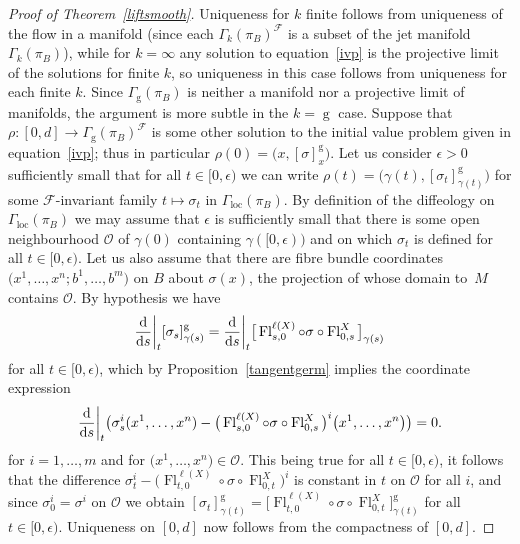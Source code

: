 \documentclass[10pt,a4paper]{amsart}
\numberwithin{equation}{section}
\def\loc{\operatorname{loc}}
\def\g{\operatorname{g}}
\def\Fl{\operatorname{Fl}}
\def\FF{{\mathcal{F}}}
\def\OO{{\mathcal{O}}}
\begin{document}
\begin{proof}[Proof of Theorem~\ref{liftsmooth}]
Uniqueness for $k$ finite follows from uniqueness of the flow in a manifold (since each $\Gamma_{k}(\pi_{B})^{\FF}$ is a subset of the jet manifold $\Gamma_{k}(\pi_{B})$), while for $k=\infty$ any solution to equation~\eqref{ivp} is the projective limit of the solutions for finite $k$, so uniqueness in this case follows from uniqueness for each finite $k$. Since $\Gamma_{\g}(\pi_{B})$ is neither a manifold nor a projective limit of manifolds, the argument is more subtle in the $k=\g$ case. Suppose that $\rho\colon [0,d]\rightarrow\Gamma_{\g}(\pi_{B})^{\FF}$ is some other solution to the initial value problem given in equation~\eqref{ivp}; thus in particular $\rho(0) = \big(x,[\sigma]^{\g}_{x}\big)$. Let us consider $\epsilon>0$ sufficiently small that for all $t\in[0,\epsilon)$ we can write $\rho(t) = \big(\gamma(t),[\sigma_{t}]^{\g}_{\gamma(t)}\big)$ for some $\FF$-invariant family $t\mapsto\sigma_{t}$ in $\Gamma_{\loc}(\pi_{B})$. By definition of the diffeology on $\Gamma_{\loc}(\pi_{B})$ we may assume that $\epsilon$ is sufficiently small that there is some open neighbourhood $\OO$ of $\gamma(0)$ containing $\gamma([0,\epsilon))$ and on which $\sigma_{t}$ is defined for all $t\in[0,\epsilon)$. Let us also assume that there are fibre bundle coordinates $\big(x^{1},\dots,x^{n};b^{1},\dots,b^{m}\big)$ on $B$ about $\sigma(x)$, the projection of whose domain to~$M$ contains $\OO$. By hypothesis we have\vspace{-1ex}
\begin{gather*}
\frac{\rm d}{{\rm d}s}\bigg|_{t}[\sigma_{s}]^{\g}_{\gamma(s)} = \frac{\rm d}{{\rm d}s}\bigg|_{t}\big[\Fl^{\ell(X)}_{s,0}\circ\sigma\circ\Fl^{X}_{0,s}\big]_{\gamma(s)}
\end{gather*}
for all $t\in[0,\epsilon)$, which by Proposition~\ref{tangentgerm} implies the coordinate expression\vspace{-1ex}
\begin{gather*}
\frac{\rm d}{{\rm d}s}\bigg|_{t}\big(\sigma^{i}_{s}(x^{1},\dots,x^{n})- \big(\Fl^{\ell(X)}_{s,0}\circ\sigma\circ\Fl^{X}_{0,s}\big)^{i}\big(x^{1},\dots,x^{n}\big)\big) = 0.
\end{gather*}
for $i=1,\dots,m$ and for $\big(x^{1},\dots,x^{n}\big)\in\OO$. This being true for all $t\in[0,\epsilon)$, it follows that the difference $\sigma^{i}_{t}-\big(\Fl^{\ell(X)}_{t,0}\circ\sigma\circ\Fl^{X}_{0,t}\big)^{i}$ is constant in $t$ on $\OO$ for all $i$, and since $\sigma^{i}_{0} = \sigma^{i}$ on $\OO$ we obtain $[\sigma_{t}]^{\g}_{\gamma(t)} = \big[\Fl^{\ell(X)}_{t,0}\circ\sigma\circ\Fl^{X}_{0,t}\big]^{\g}_{\gamma(t)}$ for all $t\in[0,\epsilon)$. Uniqueness on $[0,d]$ now follows from the compactness of $[0,d]$.



\end{proof}
\end{document}

